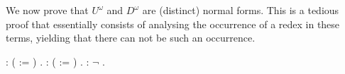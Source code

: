 We now prove that $U^\omega$ and $D^\omega$ are (distinct) normal
forms. This is a tedious proof that essentially consists of analysing
the occurrence of a redex in these terms, yielding that there can not
be such an occurrence.
\begin{singlespace}
\begin{coqdoccode}
\coqdocnoindent
{}  :
( :=
)
.\coqdoceol
\coqdocemptyline
\coqdocnoindent
{}  :
( :=
)
.\coqdoceol
\coqdocemptyline
\coqdocnoindent
{}
 :
\ensuremath{\lnot}
.\coqdoceol
\end{coqdoccode}
\end{singlespace}

